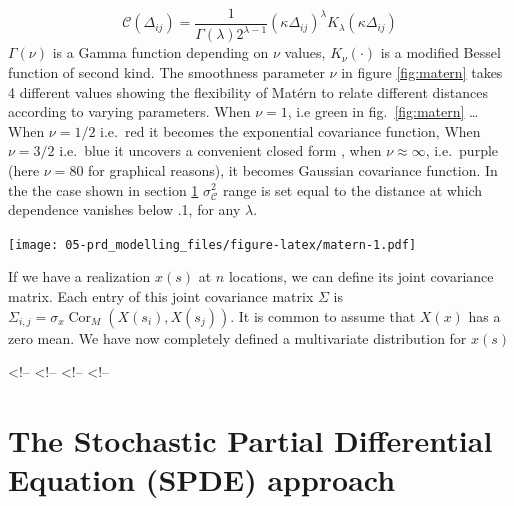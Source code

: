 \documentclass[
  12pt,
  a4paper,
  oneside]{book}
\theoremstyle{definition}
\theoremstyle{definition}
\theoremstyle{definition}
\theoremstyle{remark}
\begin{document}
\[
\mathscr{C}\left(\Delta_{i j}\right)=\frac{1}{\Gamma(\lambda) 2^{\lambda-1}}\left(\kappa \Delta_{i j}\right)^{\lambda} K_{\lambda}\left(\kappa \Delta_{i j}\right)
\]
\(\Gamma(\nu)\) is a Gamma function depending on \(\nu\) values, \(K_{\nu}(\cdot)\) is a modified Bessel function of second kind. The smoothness parameter \(\nu\) in figure \ref{fig:matern} takes 4 different values showing the flexibility of Matérn to relate different distances according to varying parameters. When \(\nu = 1\), i.e green in fig.~\ref{fig:matern} \ldots{} When \(\nu = 1/2\) i.e.~red it becomes the exponential covariance function, When \(\nu = 3/2\) i.e.~blue it uncovers a convenient closed form \citep{LecturePaci}, when \(\nu \approx \infty\), i.e.~purple (here \(\nu = 80\) for graphical reasons), it becomes Gaussian covariance function. In the the case shown in section \ref{spdeapproach} \(\sigma_{\mathscr{C}}^{2}\) range is set equal to the distance at which dependence vanishes below .1, for any \(\lambda\).

\texttt{[image: 05-prd\_modelling\_files/figure-latex/matern-1.pdf]}

If we have a realization \(x(s)\) at \(n\) locations, we can define its joint covariance matrix. Each entry of this joint covariance matrix \(\Sigma\) is \(\Sigma_{i, j}=\sigma_{x} \operatorname{Cor}_{M}\left(X\left(s_{i}\right), X\left(s_{j}\right)\right)\). It is common to assume that \(X(x)\) has a zero mean. We have now completely defined a multivariate distribution for \(x(s)\)

\textless!--
\textless!--
\textless!--
\textless!--

\hypertarget{spdeapproach}{%
\section{The Stochastic Partial Differential Equation (SPDE) approach}\label{spdeapproach}}
\end{document}

